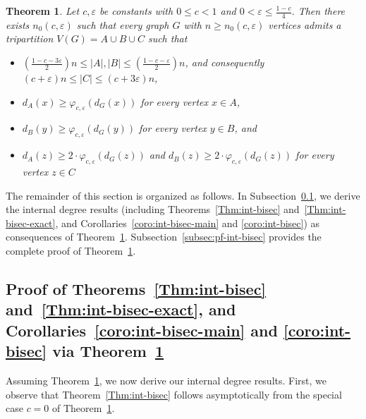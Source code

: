 \documentclass{aic}
\newtheorem{theorem}[dfn]{Theorem}
\begin{document}
	\begin{theorem}\label{Thm:min-indegree}
		Let $c, \varepsilon$ be constants with $0\leq c<1$ and $0<\varepsilon\leq \frac{1-c}{4}.$
		Then there exists $n_0(c,\varepsilon)$ such that every graph $G$ with $n\geq n_0(c,\varepsilon)$ vertices admits a tripartition $V(G)=A\cup B\cup C$ such that
		\begin{itemize}
			\item[(a).] $\left(\frac{1-c-3\varepsilon}{2}\right)n\leq |A|,|B|\leq \left(\frac{1-c-\varepsilon}{2}\right)n$, and consequently $(c+\varepsilon)n\leq |C|\leq \left(c+3\varepsilon\right)n$,
			\item[(b).] $d_{A}(x)\geq \varphi_{c,\varepsilon}(d_G(x))$ for every vertex $x\in A$,
			\item[(c).] $d_{B}(y)\geq \varphi_{c,\varepsilon}(d_G(y))$ for every vertex $y\in B$, and
			\item[(d).] $d_{A}(z)\geq 2\cdot \varphi_{c,\varepsilon}(d_G(z))$ and $d_B(z)\geq 2\cdot \varphi_{c,\varepsilon}(d_G(z))$ for every vertex $z\in C$
		\end{itemize}
	\end{theorem}
	
	
	The remainder of this section is organized as follows.
	In Subsection~\ref{subsec:int-bisec-exact},
	we derive the internal degree results (including Theorems~\ref{Thm:int-bisec} and~\ref{Thm:int-bisec-exact}, and Corollaries~\ref{coro:int-bisec-main} and \ref{coro:int-bisec}) as consequences of Theorem~\ref{Thm:min-indegree}.
	Subsection~\ref{subsec:pf-int-bisec} provides the complete proof of Theorem~\ref{Thm:min-indegree}.
	
	
	\subsection{Proof of Theorems~\ref{Thm:int-bisec} and~\ref{Thm:int-bisec-exact}, and Corollaries~\ref{coro:int-bisec-main} and \ref{coro:int-bisec} via Theorem~\ref{Thm:min-indegree}}\label{subsec:int-bisec-exact}
	\noindent
	Assuming Theorem~\ref{Thm:min-indegree},
	we now derive our internal degree results.
	First, we observe that Theorem~\ref{Thm:int-bisec} follows asymptotically from the special case $c=0$ of Theorem~\ref{Thm:min-indegree}.
	
\end{document}

